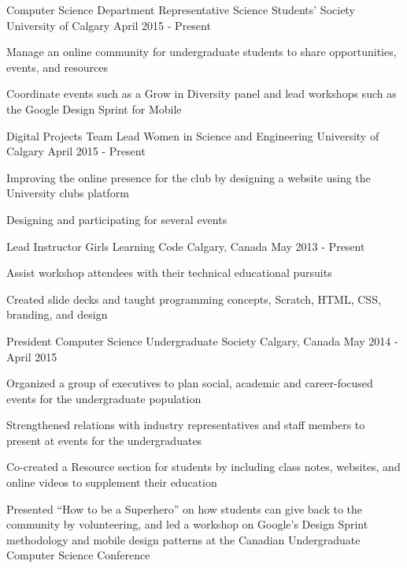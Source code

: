 \begin{cventries}
  \cventry
    {Computer Science Department Representative}
    {Science Students' Society}
    {University of Calgary}
    {April 2015 - Present}
    {
      \begin{cvitems}
        \item {Manage an online community for undergraduate students to share opportunities, events, and resources}
        \item {Coordinate events such as a Grow in Diversity panel and lead workshops such as the Google Design Sprint for Mobile}
      \end{cvitems}
    }
  \cventry
    {Digital Projects Team Lead}
    {Women in Science and Engineering}
    {University of Calgary}
    {April 2015 - Present}
    {
      \begin{cvitems}
        \item {Improving the online presence for the club by designing a website using the University clubs platform}
        \item {Designing and participating for several events}
      \end{cvitems}
    }
  \cventry
    {Lead Instructor}
    {Girls Learning Code}
    {Calgary, Canada}
    {May 2013 - Present}
    {
      \begin{cvitems}
        \item {Assist workshop attendees with their technical educational pursuits}
        \item {Created slide decks and taught programming concepts, Scratch, HTML, CSS, branding, and design}
      \end{cvitems}
    }
  \cventry
    {President}
    {Computer Science Undergraduate Society}
    {Calgary, Canada}
    {May 2014 - April 2015}
    {
      \begin{cvitems}
        \item {Organized a group of executives to plan social, academic and career-focused events for the undergraduate population}
        \item {Strengthened relations with industry representatives and staff members to present at events for the undergraduates}
        \item {Co-created a Resource section for students by including class notes, websites, and online videos to supplement their education}
        \item {Presented ``How to be a Superhero'' on how students can give back to the community by volunteering, and led a workshop on Google's Design Sprint methodology and mobile design patterns at the Canadian Undergraduate Computer Science Conference}

\end{cvitems}}
\end{cventries}
